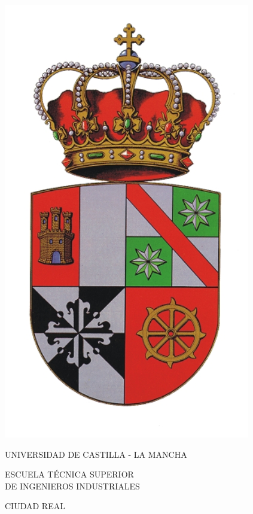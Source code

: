 \documentclass[twoside,openright,12pt]{report}
\begin{document}
\pagestyle{empty}
\begin{titlepage}

\begin{center}
\includegraphics{uclm} %
\bigskip
\medskip

\fontsize{17pt}{19pt}
{\selectfont  UNIVERSIDAD DE CASTILLA - LA MANCHA} \\ 
\bigskip
\smallskip

{\selectfont ESCUELA TÉCNICA SUPERIOR \\ \medskip
DE INGENIEROS INDUSTRIALES}


\bigskip
\medskip
{}\fontsize{15pt}{17pt}
{\selectfont CIUDAD REAL}

\vspace*{2cm} 


\end{center}
\end{titlepage}
\end{document}
